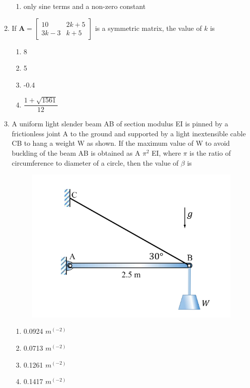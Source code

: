 \documentclass[journal]{IEEEtran}
\numberwithin{equation}{enumi}
\numberwithin{figure}{enumi}
\begin{document}
\begin{enumerate}
\begin{enumerate}
\item only sine terms and a non-zero constant
\end{enumerate}
\item If \(\mathbf{A} = \begin{bmatrix}
10 & 2k + 5 \\
3k - 3 & k + 5
\end{bmatrix}\) is a symmetric matrix, the value of \(k\) is  
\begin{multicols}{4}
\begin{enumerate}
    \item 8
    \item 5
    \item -0.4
    \item $\dfrac{1 + \sqrt{1561}}{12}$
\end{enumerate}
\end{multicols}
\item A uniform light slender beam AB of section modulus EI is pinned by a frictionless joint A to the ground and supported by a light inextensible cable CB to hang a weight W as shown. If the maximum value of W to avoid buckling of the beam AB is obtained as A $\pi^2 $ EI, where $\pi$ is the ratio of circumference to diameter of a circle,
then the value of $\beta$ is
\begin{figure}[H]
    \centering
    \includegraphics[width = 0.5\columnwidth]{figs/fig4.6.png}
    \caption*{}
    \label{fig:Q16}
    \end{figure}

\begin{multicols}{4}
    \begin{enumerate}
        \item 0.0924 $m^(-2)$
        \item 0.0713  $m^(-2)$
        \item 0.1261 $m^(-2)$
        \item 0.1417 $m^(-2)$
    \end{enumerate}
\end{multicols}


\end{enumerate}
\end{document}
